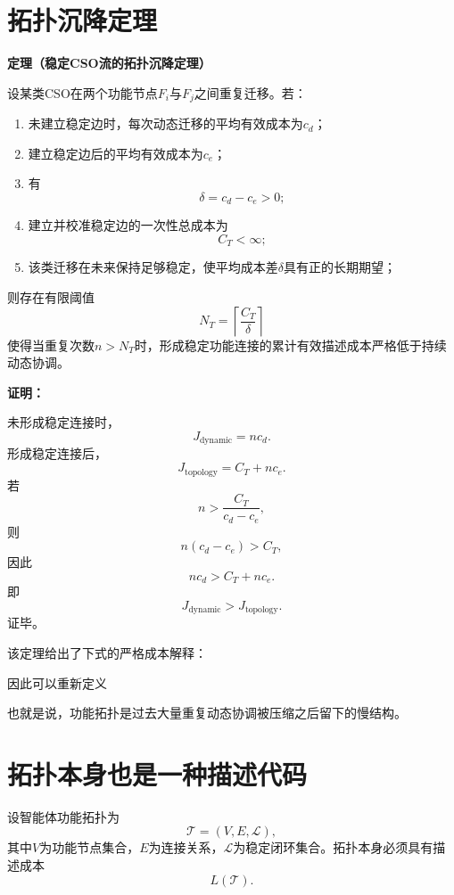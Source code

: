 \section{拓扑沉降定理}

\textbf{定理（稳定CSO流的拓扑沉降定理）}

设某类CSO在两个功能节点$F_i$与$F_j$之间重复迁移。若：

\begin{enumerate}
    \item 未建立稳定边时，每次动态迁移的平均有效成本为$c_d$；
    \item 建立稳定边后的平均有效成本为$c_e$；
    \item 有
    \[
    \delta=c_d-c_e>0;
    \]
    \item 建立并校准稳定边的一次性总成本为
    \[
    C_T<\infty;
    \]
    \item 该类迁移在未来保持足够稳定，使平均成本差$\delta$具有正的长期期望；
\end{enumerate}

则存在有限阈值
\[
\boxed{
N_T
=
\left\lceil
\frac{C_T}{\delta}
\right\rceil
}
\]
使得当重复次数$n>N_T$时，形成稳定功能连接的累计有效描述成本严格低于持续动态协调。

\textbf{证明：}

未形成稳定连接时，
\[
J_{\mathrm{dynamic}}
=
nc_d.
\]
形成稳定连接后，
\[
J_{\mathrm{topology}}
=
C_T+nc_e.
\]
若
\[
n>
\frac{C_T}{c_d-c_e},
\]
则
\[
n(c_d-c_e)>C_T,
\]
因此
\[
nc_d>C_T+nc_e.
\]
即
\[
J_{\mathrm{dynamic}}
>
J_{\mathrm{topology}}.
\]
证毕。

该定理给出了下式的严格成本解释：
\begin{statementbox}
\centering
{}
\end{statementbox}

因此可以重新定义
\begin{statementbox}
\centering
{}
\end{statementbox}

也就是说，功能拓扑是过去大量重复动态协调被压缩之后留下的慢结构。

\section{拓扑本身也是一种描述代码}

设智能体功能拓扑为
\[
\mathcal{T}
=
(V,E,\mathcal{L}),
\]
其中$V$为功能节点集合，$E$为连接关系，$\mathcal{L}$为稳定闭环集合。拓扑本身必须具有描述成本
\[
\boxed{
L(\mathcal{T}).
}
\]

